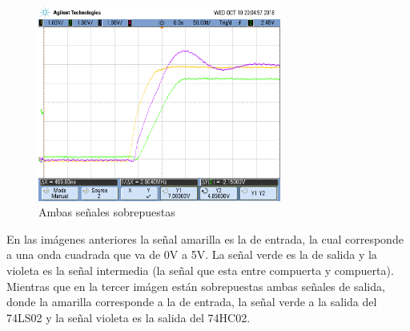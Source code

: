 \begin{figure}[hbtp]
	\centering
		\includegraphics[width=8cm]{ejercicio2/OSC_AMBAS.png}
	\caption{Ambas señales sobrepuestas}
\end{figure}

En las im\'agenes anteriores la señal amarilla es la de entrada, la cual corresponde a una onda cuadrada que va de 0V a 5V. La señal verde es la de salida y la violeta es la señal intermedia (la señal que esta entre compuerta y compuerta). Mientras que en la tercer im\'agen est\'an sobrepuestas ambas señales de salida, donde la amarilla corresponde a la de entrada, la señal verde a la salida del 74LS02 y la señal violeta es la salida del 74HC02.



